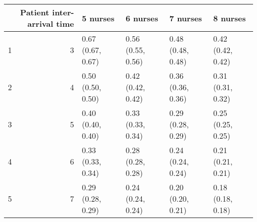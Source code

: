 \begin{table}[ht]
\centering
\begin{tabular}{rrllll}
  \hline
 & Patient inter-arrival time & 5 nurses & 6 nurses & 7 nurses & 8 nurses \\ 
  \hline
1 &   3 & 0.67 (0.67, 0.67) & 0.56 (0.55, 0.56) & 0.48 (0.48, 0.48) & 0.42 (0.42, 0.42) \\ 
  2 &   4 & 0.50 (0.50, 0.50) & 0.42 (0.42, 0.42) & 0.36 (0.36, 0.36) & 0.31 (0.31, 0.32) \\ 
  3 &   5 & 0.40 (0.40, 0.40) & 0.33 (0.33, 0.34) & 0.29 (0.28, 0.29) & 0.25 (0.25, 0.25) \\ 
  4 &   6 & 0.33 (0.33, 0.34) & 0.28 (0.28, 0.28) & 0.24 (0.24, 0.24) & 0.21 (0.21, 0.21) \\ 
  5 &   7 & 0.29 (0.28, 0.29) & 0.24 (0.24, 0.24) & 0.20 (0.20, 0.21) & 0.18 (0.18, 0.18) \\ 
   \hline
\end{tabular}
\end{table}
